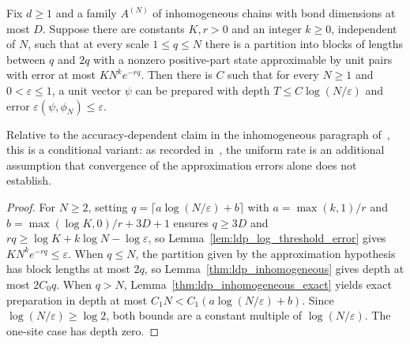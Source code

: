 \begin{lemma}
    \label{thm:ldp_inhomogeneous_uniform_rate}
    \leanok
    Fix $d\ge1$ and a family $A^{(N)}$ of inhomogeneous chains with bond
    dimensions at most $D$. Suppose there are constants $K,r>0$ and an integer
    $k\ge0$, independent of $N$, such that at every scale $1\le q\le N$
    there is a partition into blocks of lengths between $q$ and $2q$ with a
    nonzero positive-part state approximable by unit pairs with error at most
    $KN^k e^{-rq}$. Then there is $C$ such that for every $N\ge1$ and
    $0<\varepsilon\le1$, a unit vector $\psi$ can be prepared with depth
    $T\le C\log(N/\varepsilon)$ and error
    $\varepsilon(\psi,\phi_N)\le\varepsilon$.

    Relative to the accuracy-dependent claim in the inhomogeneous paragraph
    of~\cite{Malz2024Preparation}, this is a conditional variant: as recorded
    in~\cite{gap:mswc24_inhomogeneous_scope}, the uniform rate is an additional
    assumption that convergence of the approximation errors alone does not
    establish.
\end{lemma}
\begin{proof}
    \leanok
    For $N\ge2$, setting $q=\lceil a\log(N/\varepsilon)+b\rceil$ with
    $a=\max(k,1)/r$ and $b=\max(\log K,0)/r+3D+1$ ensures $q\ge3D$ and
    $rq\ge\log K+k\log N-\log\varepsilon$, so Lemma~\ref{lem:ldp_log_threshold_error}
    gives $KN^k e^{-rq}\le\varepsilon$.
    When $q\le N$, the partition given by the approximation hypothesis has
    block lengths at most $2q$, so Lemma~\ref{thm:ldp_inhomogeneous}
    gives depth at most $2C_0q$. When $q>N$,
    Lemma~\ref{thm:ldp_inhomogeneous_exact} yields exact preparation in
    depth at most $C_1N<C_1(a\log(N/\varepsilon)+b)$.
    Since $\log(N/\varepsilon)\ge\log2$, both bounds are a constant multiple
    of $\log(N/\varepsilon)$. The one-site case has depth zero.
\end{proof}
